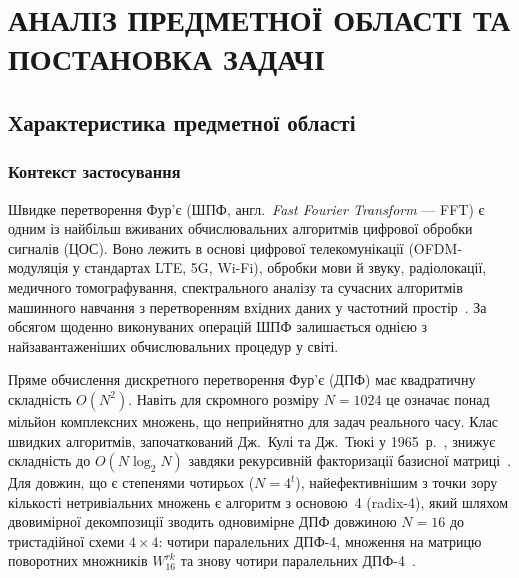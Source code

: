 \section{АНАЛІЗ ПРЕДМЕТНОЇ ОБЛАСТІ ТА ПОСТАНОВКА ЗАДАЧІ}

%

\subsection{Характеристика предметної області}

\subsubsection*{Контекст застосування}

Швидке перетворення Фур'є (ШПФ, англ.\ \textit{Fast Fourier Transform}
--- FFT) є одним із найбільш вживаних обчислювальних алгоритмів
цифрової обробки сигналів (ЦОС). Воно лежить в основі цифрової
телекомунікації (OFDM-модуляція у стандартах LTE, 5G, Wi-Fi),
обробки мови й звуку, радіолокації, медичного томографування,
спектрального аналізу та сучасних алгоритмів машинного навчання
з перетворенням вхідних даних у частотний простір~\cite{nussbaumer1982,protsko2025}.
За обсягом щоденно виконуваних операцій ШПФ залишається однією з
найзавантаженіших обчислювальних процедур у світі.

Пряме обчислення дискретного перетворення Фур'є (ДПФ) має
квадратичну складність $O(N^2)$. Навіть для скромного розміру
$N = 1024$ це означає понад мільйон комплексних множень,
що неприйнятно для задач реального часу. Клас швидких алгоритмів,
започаткований Дж.~Кулі та Дж.~Тюкі у 1965~р.~\cite{cooley1965},
знижує складність до $O(N \log_2 N)$ завдяки рекурсивній
факторизації базисної матриці~\cite{nussbaumer1982}. Для довжин,
що є степенями чотирьох ($N = 4^t$), найефективнішим з точки зору
кількості нетривіальних множень є алгоритм з основою~4 (radix-4),
який шляхом двовимірної декомпозиції зводить одновимірне ДПФ
довжиною $N = 16$ до тристадійної схеми $4 \times 4$: чотири
паралельних ДПФ-4, множення на матрицю поворотних множників
$W_{16}^{rk}$ та знову чотири паралельних ДПФ-4~\cite{burrus1985dft}.


